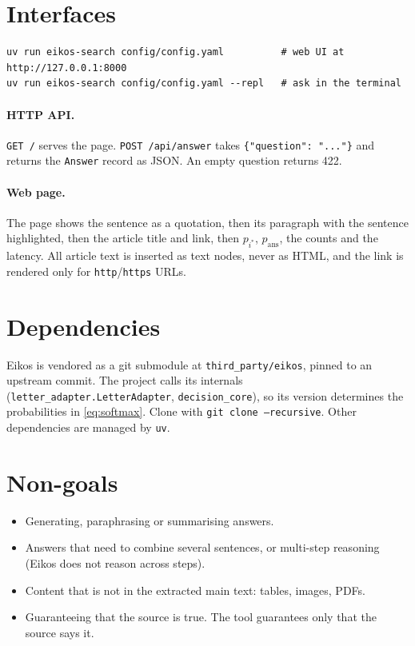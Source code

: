 \documentclass[11pt,a4paper]{article}
\newcommand{\code}[1]{\texttt{#1}}
\begin{document}
\section{Interfaces}

\begin{lstlisting}
uv run eikos-search config/config.yaml          # web UI at http://127.0.0.1:8000
uv run eikos-search config/config.yaml --repl   # ask in the terminal
\end{lstlisting}

\paragraph{HTTP API.} \code{GET /} serves the page. \code{POST /api/answer} takes \code{\{"question": "..."\}} and
returns the \code{Answer} record as JSON. An empty question returns 422.

\paragraph{Web page.} The page shows the sentence as a quotation, then its paragraph with the sentence highlighted, then
the article title and link, then $p_{i^\ast}$, $p_{\text{ans}}$, the counts and the latency. All article text is inserted as text nodes, never as
HTML, and the link is rendered only for \code{http}/\code{https} URLs.

\section{Dependencies}

Eikos is vendored as a git submodule at \code{third\_party/eikos}, pinned to an upstream commit. The project calls its
internals (\code{letter\_adapter.LetterAdapter}, \code{decision\_core}), so its version determines the probabilities in
\eqref{eq:softmax}. Clone with \code{git clone --recursive}. Other dependencies are managed by \code{uv}.

\section{Non-goals}

\begin{itemize}
  \item Generating, paraphrasing or summarising answers.
  \item Answers that need to combine several sentences, or multi-step reasoning (Eikos does not reason across steps).
  \item Content that is not in the extracted main text: tables, images, PDFs.
  \item Guaranteeing that the source is true. The tool guarantees only that the source says it.
\end{itemize}
\end{document}
